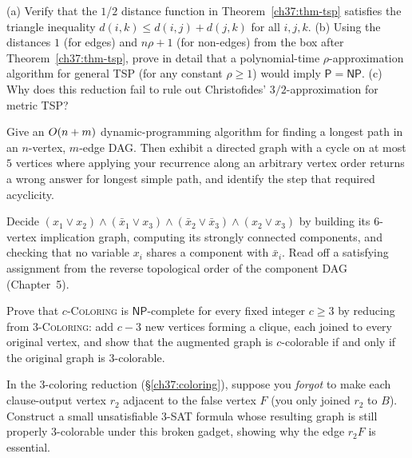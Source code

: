 \begin{exercise}
\label{ch37:ex-tsp}
(a) Verify that the $1$/$2$ distance function in Theorem~\ref{ch37:thm-tsp} satisfies the
triangle inequality $d(i,k)\le d(i,j)+d(j,k)$ for all $i,j,k$. (b) Using the distances $1$ (for edges) and $n\rho+1$ (for non-edges) from the box after
Theorem~\ref{ch37:thm-tsp}, prove in detail that a polynomial-time $\rho$-approximation algorithm for general \textsc{TSP} (for any constant $\rho\ge 1$) would imply $\mathsf{P}=\mathsf{NP}$. (c) Why does this reduction fail to rule out Christofides'
$3/2$-approximation for metric \textsc{TSP}?
\end{exercise}

\begin{exercise}
\label{ch37:ex-dag}
Give an $O(n+m)$ dynamic-programming algorithm for finding a longest path in an $n$-vertex, $m$-edge DAG. Then exhibit a directed graph with a cycle on at most $5$ vertices where applying your recurrence along an arbitrary vertex order returns a wrong answer for longest simple path, and identify the step that required acyclicity.
\end{exercise}

\begin{exercise}
\label{ch37:ex-2sat}
Decide $(x_1\vee x_2)\wedge(\bar{x}_1\vee x_3)\wedge(\bar{x}_2\vee\bar{x}_3)\wedge
(x_2\vee x_3)$ by building its $6$-vertex implication graph, computing
its strongly connected components, and checking that no variable $x_i$ shares a component
with $\bar{x}_i$. Read off a satisfying assignment from the reverse
topological order of the component DAG (Chapter~5).
\end{exercise}

\begin{exercise}
\label{ch37:ex-clift}
Prove that \textsc{$c$-Coloring} is $\mathsf{NP}$-complete for every fixed integer $c\ge
3$ by reducing from \textsc{3-Coloring}: add $c-3$ new vertices forming a clique, each
joined to every original vertex, and show that the augmented graph is
$c$-colorable if and only if the original graph is $3$-colorable.
\end{exercise}

\begin{exercise}
\label{ch37:ex-break}
In the 3-coloring reduction (\S\ref{ch37:coloring}), suppose you \emph{forgot} to
make each clause-output vertex $r_2$ adjacent to the false vertex $F$ (you only joined $r_2$ to
$B$). Construct a small unsatisfiable \textsc{3-SAT} formula whose resulting graph is still
properly 3-colorable under this broken gadget, showing why the edge $r_2F$ is essential.
\end{exercise}

